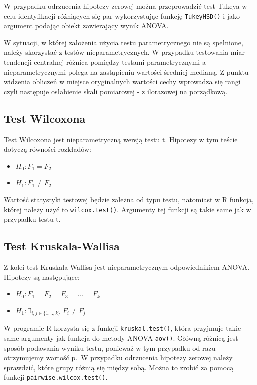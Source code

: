 \documentclass[]{book}
\providecommand{\tightlist}{%
  \setlength{\itemsep}{0pt}\setlength{\parskip}{0pt}}
\begin{document}
W przypadku odrzucenia hipotezy zerowej można przeprowadzić test Tukeya w celu identyfikacji różniących się par wykorzystując funkcję \texttt{TukeyHSD()} i jako argument podając obiekt zawierający wynik ANOVA.

W sytuacji, w której założenia użycia testu parametrycznego nie są spełnione, należy skorzystać z testów nieparametrycznych. W przypadku testowania miar tendencji centralnej różnica pomiędzy testami parametrycznymi a nieparametrycznymi polega na zastąpieniu wartości średniej medianą. Z punktu widzenia obliczeń w miejsce oryginalnych wartości cechy wprowadza się rangi czyli następuje osłabienie skali pomiarowej - z ilorazowej na porządkową.

\hypertarget{test-wilcoxona}{%
\subsection{Test Wilcoxona}\label{test-wilcoxona}}

Test Wilcoxona jest nieparametryczną wersją testu t. Hipotezy w tym teście dotyczą równości rozkładów:

\begin{itemize}
\tightlist
\item
  \(H_0: F_1=F_2\)
\item
  \(H_1: F_1 \neq F_2\)
\end{itemize}

Wartość statystyki testowej będzie zależna od typu testu, natomiast w R funkcja, której należy użyć to \texttt{wilcox.test()}. Argumenty tej funkcji są takie same jak w przypadku testu t.

\hypertarget{test-kruskala-wallisa}{%
\subsection{Test Kruskala-Wallisa}\label{test-kruskala-wallisa}}

Z kolei test Kruskala-Wallisa jest nieparametrycznym odpowiednikiem ANOVA. Hipotezy są następujące:

\begin{itemize}
\tightlist
\item
  \(H_0: F_1=F_2=F_3=...=F_k\)
\item
  \(H_1: \exists_{i,j\in\{1,..,k\}} \; F_i \neq F_j\)
\end{itemize}

W programie R korzysta się z funkcji \texttt{kruskal.test()}, która przyjmuje takie same argumenty jak funkcja do metody ANOVA \texttt{aov()}. Główną różnicą jest sposób podawania wyniku testu, ponieważ w tym przypadku od razu otrzymujemy wartość p.~W przypadku odrzucenia hipotezy zerowej należy sprawdzić, które grupy różnią się między sobą. Można to zrobić za pomocą funkcji \texttt{pairwise.wilcox.test()}.
\end{document}
